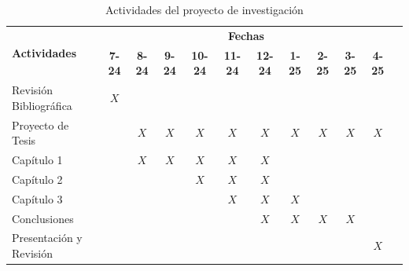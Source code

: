 \begin{center}
\begin{table}[htb]
\begin{tabular}{|p{4cm}|c|c|c|c|c|c|c|c|c|c|c|}
\hline
\multirow{2}{*}{\textbf{Actividades }} &\multicolumn{10}{c|}{\textbf{Fechas}} \\

 \cline{2-11}
 & \textbf{7-24} & \textbf{8-24} & \textbf{9-24}&\textbf{10-24}&\textbf{11-24}&\textbf{12-24}&
 \textbf{1-25}&\textbf{2-25}&\textbf{3-25}&\textbf{4-25}\\ \hline
 Revisión Bibliográfica & $X$ &&&&&&&&&\\ \hline
 Proyecto de Tesis &&$X$ &$X$&$X$&$X$&$X$&$X$&$X$&$X$&$X$ \\ \hline
 Capítulo 1 &&$X$ & $X$&$X$&$X$&$X$&&&&\\ \hline
Capítulo 2&&& &$X$&$X$& $X$& &&&\\ \hline
Capítulo 3 &&& &&$X$&$X$&$X$& & &\\ \hline
Conclusiones&&& &&&$X$&$X$&$X$&$X$& \\ \hline
Presentación y Revisión&&& &&&&&&&$X$\\ \hline
\end{tabular}
\caption{Actividades del proyecto de investigación}
\label{tabla:final}
\end{table}
\end{center}

\printbibliography[heading=bibintoc,title={Bibliografía}]

